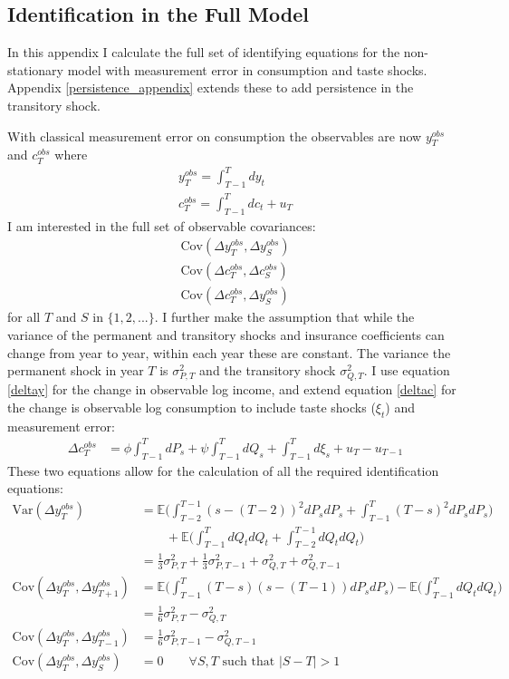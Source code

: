 \subsection{Identification in the Full Model} \label{identification}
In this appendix I calculate the full set of identifying equations for the non-stationary model with measurement error in consumption and taste shocks. Appendix \ref{persistence_appendix} extends these to add persistence in the transitory shock.

With classical measurement error on consumption the observables are now $y^{obs}_T$ and $c^{obs}_T$ where
\begin{align*}
y^{obs}_T = \int_{T-1}^{T} dy_t \\
c^{obs}_T = \int_{T-1}^{T} dc_t + u_T
\end{align*}
I am interested in the full set of observable covariances:
\begin{align*}
\mathrm{Cov}(\Delta y^{obs}_T, \Delta y^{obs}_S) \\
\mathrm{Cov}(\Delta c^{obs}_T, \Delta c^{obs}_S) \\
\mathrm{Cov}(\Delta c^{obs}_T,  \Delta y^{obs}_S)
\end{align*}
for all $T$ and $S$ in $\{1,2,...\}$. I further make the assumption that while the variance of the permanent and transitory shocks and insurance coefficients can change from year to year, within each year these are constant. The variance the permanent shock in year $T$ is $\sigma^2_{P,T}$ and the transitory shock $\sigma^2_{Q,T}$. I use equation \ref{deltay} for the change in observable log income, and extend equation \ref{deltac} for the change is observable log consumption to include taste shocks ($\xi_t$) and measurement error:
\begin{align*}
\Delta c^{obs}_T &= \phi  \int_{T-1}^{T} dP_s  +\psi \int_{T-1}^{T}dQ_s +\int_{T-1}^{T}d\xi_s  + u_T - u_{T-1} \nonumber
\end{align*}
These two equations allow for the calculation of all the required identification equations:
\begin{align}
\mathrm{Var}(\Delta y^{obs}_T) &= \mathbb{E} \Big(\int_{T-2}^{T-1} (s-(T-2))^2 dP_s dP_s  + \int_{T-1}^{T} (T-s)^2 dP_s dP_s \Big) \nonumber \\
& \qquad + \mathbb{E} \Big(\int_{T-1}^{T} dQ_t dQ_t +\int_{T-2}^{T-1} dQ_t dQ_t \Big) \nonumber \\
&= \frac{1}{3} \sigma^2_{P,T} + \frac{1}{3} \sigma^2_{P,T-1} +  \sigma^2_{Q,T} +  \sigma^2_{Q,T-1} \label{inc_var_indentification}\\
\mathrm{Cov}(\Delta y^{obs}_T, \Delta y^{obs}_{T+1}) &=  \mathbb{E} \Big(\int_{T-1}^{T} (T-s)(s-(T-1)) dP_s dP_s  \Big) - \mathbb{E} \Big(\int_{T-1}^{T} dQ_t dQ_t \Big) \nonumber \\
&= \frac{1}{6}\sigma^2_{P,T} - \sigma^2_{Q,T} \nonumber\\
\mathrm{Cov}(\Delta y^{obs}_T, \Delta y^{obs}_{T-1}) &= \frac{1}{6}\sigma^2_{P,T-1} - \sigma^2_{Q,T-1} \nonumber\\
\mathrm{Cov}(\Delta y^{obs}_T, \Delta y^{obs}_{S}) &= 0 \qquad \forall S,T \text{ such that }|S-T| >1 \nonumber
\end{align}
